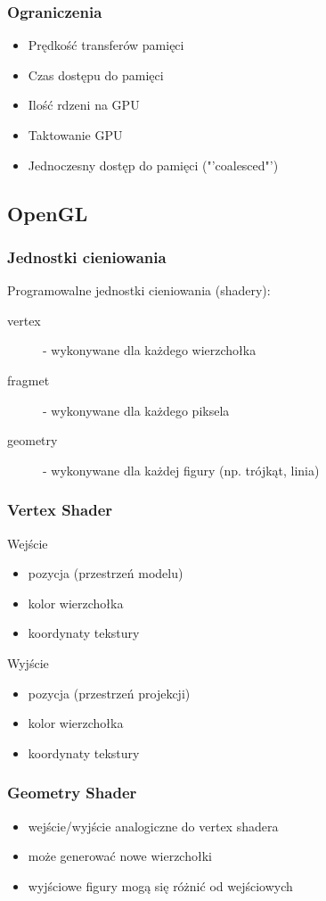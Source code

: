 \documentclass{beamer}
\begin{document}
\frame
{
	\frametitle{Ograniczenia}
	\begin{itemize}
	\item{Prędkość transferów pamięci}
	\item{Czas dostępu do pamięci}
	\item{Ilość rdzeni na GPU}
	\item{Taktowanie GPU}
	\item{Jednoczesny dostęp do pamięci ("'coalesced"')}
	\end{itemize}
}

\subsection{OpenGL}\label{sub:opengl}

\frame
{
	\frametitle{Jednostki cieniowania}

	Programowalne jednostki cieniowania (shadery):

		\begin{description}
	\item[vertex] - wykonywane dla każdego wierzchołka
		\item[fragmet] - wykonywane dla każdego piksela
		\pause
		\item[geometry] - wykonywane dla każdej figury (np. trójkąt, linia)
		\end{description}

}

\frame
{
	\frametitle{Vertex Shader}
	\begin{block}{Wejście}
	\begin{itemize}
	\item pozycja (przestrzeń modelu)
		\item kolor wierzchołka
		\item koordynaty tekstury
		\end{itemize}
	\end{block}
	\begin{block}{Wyjście}
	\begin{itemize}
	\item pozycja (przestrzeń projekcji)
		\item kolor wierzchołka
		\item koordynaty tekstury
		\end{itemize}
	\end{block}
}

\frame
{
	\frametitle{Geometry Shader}

	\begin{itemize}
	\item wejście/wyjście analogiczne do vertex shadera
		\item może generować nowe wierzchołki
		\item wyjściowe figury mogą się różnić od wejściowych
		\end{itemize}
}
\end{document}
